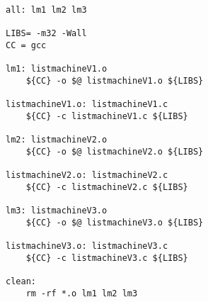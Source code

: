 \begin{lstlisting}
all: lm1 lm2 lm3

LIBS= -m32 -Wall
CC = gcc

lm1: listmachineV1.o
	${CC} -o $@ listmachineV1.o ${LIBS}

listmachineV1.o: listmachineV1.c
	${CC} -c listmachineV1.c ${LIBS}

lm2: listmachineV2.o
	${CC} -o $@ listmachineV2.o ${LIBS}

listmachineV2.o: listmachineV2.c
	${CC} -c listmachineV2.c ${LIBS}

lm3: listmachineV3.o
	${CC} -o $@ listmachineV3.o ${LIBS}

listmachineV3.o: listmachineV3.c
	${CC} -c listmachineV3.c ${LIBS}

clean:
	rm -rf *.o lm1 lm2 lm3
\end{lstlisting}